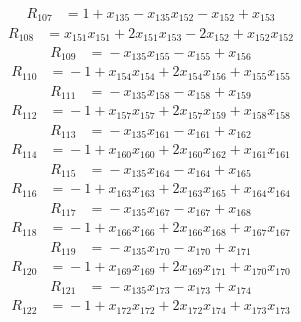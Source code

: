 \begin{align*}
R_{107}&={}1 +x_{135} -x_{135}x_{152} -x_{152} +x_{153}
\end{align*}
\begin{align*}
R_{108}&={}x_{151}x_{151} +2x_{151}x_{153} -2x_{152} +x_{152}x_{152}
\end{align*}
\begin{align*}
R_{109}&={}-x_{135}x_{155} -x_{155} +x_{156}
\end{align*}
\begin{align*}
R_{110}&={}-1 +x_{154}x_{154} +2x_{154}x_{156} +x_{155}x_{155}
\end{align*}
\begin{align*}
R_{111}&={}-x_{135}x_{158} -x_{158} +x_{159}
\end{align*}
\begin{align*}
R_{112}&={}-1 +x_{157}x_{157} +2x_{157}x_{159} +x_{158}x_{158}
\end{align*}
\begin{align*}
R_{113}&={}-x_{135}x_{161} -x_{161} +x_{162}
\end{align*}
\begin{align*}
R_{114}&={}-1 +x_{160}x_{160} +2x_{160}x_{162} +x_{161}x_{161}
\end{align*}
\begin{align*}
R_{115}&={}-x_{135}x_{164} -x_{164} +x_{165}
\end{align*}
\begin{align*}
R_{116}&={}-1 +x_{163}x_{163} +2x_{163}x_{165} +x_{164}x_{164}
\end{align*}
\begin{align*}
R_{117}&={}-x_{135}x_{167} -x_{167} +x_{168}
\end{align*}
\begin{align*}
R_{118}&={}-1 +x_{166}x_{166} +2x_{166}x_{168} +x_{167}x_{167}
\end{align*}
\begin{align*}
R_{119}&={}-x_{135}x_{170} -x_{170} +x_{171}
\end{align*}
\begin{align*}
R_{120}&={}-1 +x_{169}x_{169} +2x_{169}x_{171} +x_{170}x_{170}
\end{align*}
\begin{align*}
R_{121}&={}-x_{135}x_{173} -x_{173} +x_{174}
\end{align*}
\begin{align*}
R_{122}&={}-1 +x_{172}x_{172} +2x_{172}x_{174} +x_{173}x_{173}
\end{align*}
